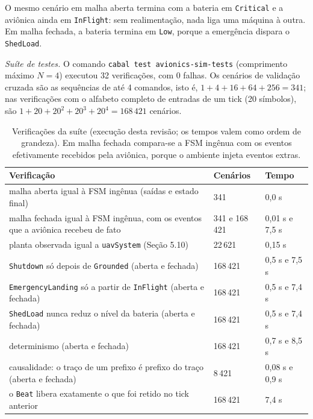 \documentclass[12pt,a4paper]{article}
\begin{document}
O mesmo cenário em malha aberta termina com a bateria em \texttt{Critical} e a aviônica ainda em \texttt{InFlight}: sem realimentação, nada liga uma máquina à outra. Em malha fechada, a bateria termina em \texttt{Low}, porque a emergência dispara o \texttt{ShedLoad}.

\textit{Suíte de testes.} O comando \texttt{cabal test avionics-sim-tests} (comprimento máximo $N = 4$) executou 32 verificações, com 0 falhas. Os cenários de validação cruzada são as sequências de até 4 comandos, isto é, $1 + 4 + 16 + 64 + 256 = 341$; nas verificações com o alfabeto completo de entradas de um tick (20 símbolos), são $1 + 20 + 20^2 + 20^3 + 20^4 = 168\,421$ cenários.

\begin{table}[h]
\centering
\footnotesize
\begin{tabular}{|p{8.3cm}|p{2.6cm}|p{2.2cm}|}
\hline
Verificação & Cenários & Tempo \\
\hline
malha aberta igual à FSM ingênua (saídas e estado final) & 341 & 0,0 s \\
\hline
malha fechada igual à FSM ingênua, com os eventos que a aviônica recebeu de fato & 341 e 168\,421 & 0,01 s e 7,5 s \\
\hline
planta observada igual a \texttt{uavSystem} (Seção 5.10) & 22\,621 & 0,15 s \\
\hline
\texttt{Shutdown} só depois de \texttt{Grounded} (aberta e fechada) & 168\,421 & 0,5 s e 7,5 s \\
\hline
\texttt{EmergencyLanding} só a partir de \texttt{InFlight} (aberta e fechada) & 168\,421 & 0,5 s e 7,4 s \\
\hline
\texttt{ShedLoad} nunca reduz o nível da bateria (aberta e fechada) & 168\,421 & 0,5 s e 7,4 s \\
\hline
determinismo (aberta e fechada) & 168\,421 & 0,7 s e 8,5 s \\
\hline
causalidade: o traço de um prefixo é prefixo do traço (aberta e fechada) & 8\,421 & 0,08 s e 0,9 s \\
\hline
o \texttt{Beat} libera exatamente o que foi retido no tick anterior & 168\,421 & 7,4 s \\
\hline
\end{tabular}
\caption{Verificações da suíte (execução desta revisão; os tempos valem como ordem de grandeza). Em malha fechada compara-se a FSM ingênua com os eventos efetivamente recebidos pela aviônica, porque o ambiente injeta eventos extras.}
\end{table}
\end{document}
